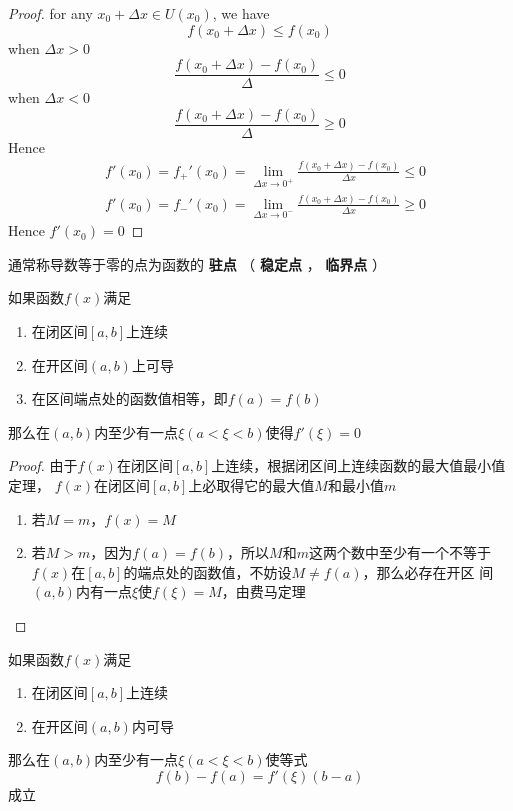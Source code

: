 \documentclass[11pt]{article}
\begin{document}
\begin{proof}
for any \(x_0+\Delta x\in U(x_0)\), we have
\begin{equation*}
f(x_0+\Delta x)\le f(x_0)
\end{equation*}
when \(\Delta x>0\)
\begin{equation*}
\frac{f(x_0+\Delta x)-f(x_0)}{\Delta}\le0
\end{equation*}
when \(\Delta x<0\)
\begin{equation*}
\frac{f(x_0+\Delta x)-f(x_0)}{\Delta}\ge0
\end{equation*}
Hence
\begin{align*}
&f'(x_0)=f_+'(x_0)=\lim_{\Delta x\to0^+}\frac{f(x_0+\Delta x)-f(x_0)}{\Delta x}\le0\\
&f'(x_0)=f_-'(x_0)=\lim_{\Delta x\to0^-}\frac{f(x_0+\Delta x)-f(x_0)}{\Delta x}\ge0
\end{align*}
Hence \(f'(x_0)=0\)
\end{proof}

通常称导数等于零的点为函数的 \textbf{驻点} （ \textbf{稳定点} ， \textbf{临界点}  ）
\begin{theorem}[罗尔定理]
如果函数\(f(x)\)满足
\begin{enumerate}
\item 在闭区间\([a,b]\)上连续
\item 在开区间\((a,b)\)上可导
\item 在区间端点处的函数值相等，即\(f(a)=f(b)\)
\end{enumerate}


那么在\((a,b)\)内至少有一点\(\xi(a<\xi<b)\)使得\(f'(\xi)=0\)
\end{theorem}

\begin{proof}
由于\(f(x)\)在闭区间\([a,b]\)上连续，根据闭区间上连续函数的最大值最小值定理，
\(f(x)\)在闭区间\([a,b]\)上必取得它的最大值\(M\)和最小值\(m\)

\begin{enumerate}
\item 若\(M=m\)，\(f(x)=M\)
\item 若\(M>m\)，因为\(f(a)=f(b)\)，所以\(M\)和\(m\)这两个数中至少有一个不等于
\(f(x)\)在\([a,b]\)的端点处的函数值，不妨设\(M\neq f(a)\)，那么必存在开区
间\((a,b)\)内有一点\(\xi\)使\(f(\xi)=M\)，由费马定理
\end{enumerate}
\end{proof}

\begin{theorem}[拉格朗日中值定理]
如果函数\(f(x)\)满足
\begin{enumerate}
\item 在闭区间\([a,b]\)上连续
\item 在开区间\((a,b)\)内可导
\end{enumerate}


那么在\((a,b)\)内至少有一点\(\xi(a<\xi<b)\)使等式
\begin{equation*}
f(b)-f(a)=f'(\xi)(b-a)
\end{equation*}
成立
\end{theorem}
\end{document}
